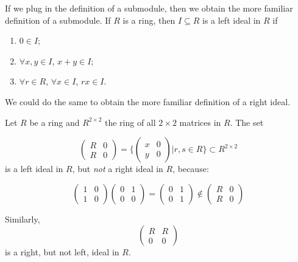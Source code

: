 \documentclass[12pt, a4paper, titlepage]{report}
\begin{document}
\begin{rem}

  If we plug in the definition of a submodule, then we obtain the more familiar definition of a submodule. If $R$ is a
  ring, then $I \subseteq R$ is a left ideal in $R$ if

  \begin{enumerate}
  \item $0 \in I$;
  \item $\forall x, y \in I$, $x + y \in I$;
  \item $\forall r \in R$, $\forall x \in I$, $rx \in I$.
  \end{enumerate}

  We could do the same to obtain the more familiar definition of a right ideal.
  
\end{rem}

\begin{exmp}
  Let $R$ be a ring and $R^{2 \times 2}$ the ring of all $2 \times 2$ matrices in $R$. The set

  \[
    \begin{pmatrix}
      R & 0\\
      R & 0
    \end{pmatrix} =
    \Big\{
    \begin{pmatrix}
      x & 0\\
      y & 0
    \end{pmatrix}
    \Big|
    r, s \in R
    \big\} \subset R^{2 \times 2}
  \]
  is a left ideal in $R$, but \textit{not} a right ideal in $R$, because:

  \[
    \begin{pmatrix}
      1 & 0\\
      1 & 0
    \end{pmatrix}
    \begin{pmatrix}
      0 & 1\\
      0 & 0
    \end{pmatrix} =
    \begin{pmatrix}
      0 & 1\\
      0 & 1
    \end{pmatrix} \notin
    \begin{pmatrix}
      R & 0\\
      R & 0
    \end{pmatrix}
  \]

  Similarly,
  \[
    \begin{pmatrix}
      R & R\\
      0 & 0
    \end{pmatrix}
  \]
  is a right, but not left, ideal in $R$.
  
\end{exmp}
\end{document}
